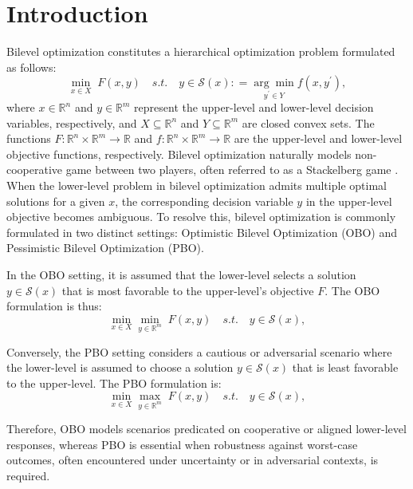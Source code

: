 \documentclass{article}
\def\x{x}
\def\y{y}
\begin{document}
\section{Introduction}
Bilevel optimization constitutes a hierarchical optimization problem formulated as follows:
\begin{equation*}
		\min_{\x\in{X}} \;F(\x, \y)\quad
		s.t.\quad \y\in\mathcal{S}(\x): =\underset{{\y^\prime \in {Y}}}{\arg\min} f(\x, \y^\prime),
\end{equation*}
where $x\in\mathbb{R}^n$ and $y\in\mathbb{R}^m$ represent the upper-level and lower-level decision variables, respectively, and ${X}\subseteq\mathbb{R}^n$ and ${Y}\subseteq\mathbb{R}^m$ are closed convex sets. The functions $F:\mathbb{R}^{n}\times\mathbb{R}^{m}\to\mathbb{R}$ and $f:\mathbb{R}^{n}\times\mathbb{R}^{m}\to\mathbb{R}$ are the upper-level and lower-level objective functions, respectively. Bilevel optimization naturally models non-cooperative game between two players, often referred to as a Stackelberg game \cite{vonStackelbergHeinrich1953TTot}. 
When the lower‐level problem in bilevel optimization admits multiple optimal solutions for a given $\x$, the corresponding decision variable $\y$ in the upper‐level objective becomes ambiguous. To resolve this, bilevel optimization is commonly formulated in two distinct settings: Optimistic Bilevel Optimization (OBO) and Pessimistic Bilevel Optimization (PBO).

In the OBO setting, it is assumed that the lower-level selects a solution $\y \in \mathcal{S}(\x)$ that is most favorable to the upper-level's objective $F$. The OBO formulation is thus:
  \begin{equation*}
      		\min_{\x\in{X}} \min_{y\in \mathbb{R}^m} \;F(\x, \y)\quad
		s.t.\quad \y\in\mathcal{S}(\x),%
  \end{equation*}

Conversely, the PBO setting considers a cautious or adversarial scenario where the lower-level is assumed to choose a solution $\y \in \mathcal{S}(\x)$ that is least favorable to the upper-level. The PBO formulation is:
  \begin{equation*}
      		\min_{\x\in{X}} \max_{y\in \mathbb{R}^m} \;F(\x, \y)\quad
		s.t.\quad \y\in\mathcal{S}(\x),%
  \end{equation*}
  
Therefore, OBO models scenarios predicated on cooperative or aligned lower-level responses, whereas PBO is essential when robustness against worst-case outcomes, often encountered under uncertainty or in adversarial contexts, is required.
\end{document}
